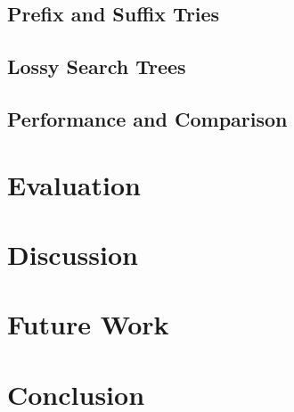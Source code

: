 \documentclass{vldb}
\begin{document}
\subsection{Prefix and Suffix Tries}

\subsection{Lossy Search Trees}

\subsection{Performance and Comparison}

\section{Evaluation}




\section{Discussion}

\section{Future Work}

\section{Conclusion}



 
\end{document}
